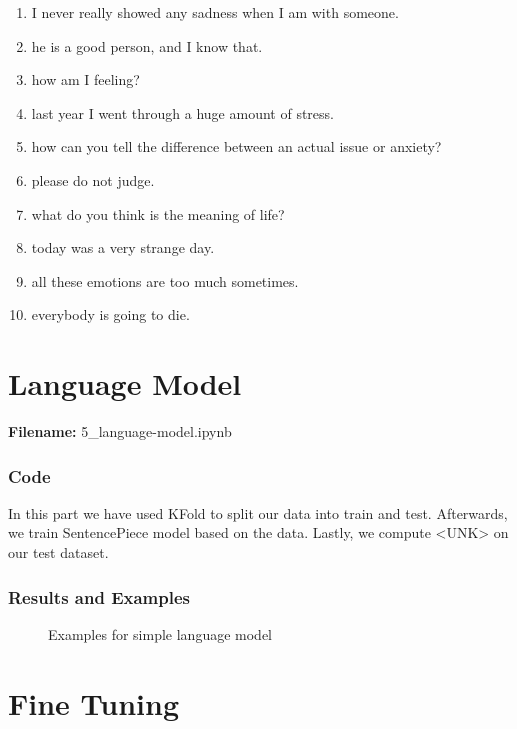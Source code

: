 \documentclass[12pt, a4paper]{article}
\begin{document}
\begin{enumerate}
	\item I never really showed any sadness when I am with someone.
	\item he is a good person, and I know that.
	\item how am I feeling?
	\item last year I went through a huge amount of stress.
	\item how can you tell the difference between an actual issue or anxiety?
	\item please do not judge.
	\item what do you think is the meaning of life?
	\item today was a very strange day.
	\item all these emotions are too much sometimes. 
	\item everybody is going to die.
\end{enumerate}

\newpage
\part{Language Model}
\large{\textbf{Filename:} 5\_language-model.ipynb}

\section*{Code}
In this part we have used KFold to split our data into train and test. Afterwards, we train SentencePiece model based on the data. Lastly, we compute <UNK> on our test dataset. 

\section*{Results and Examples}
\begin{figure}[H]
	\caption{Examples for simple language model}
	\label{normal-lm_examples}
\end{figure}


\newpage
\part{Fine Tuning}
\end{document}
